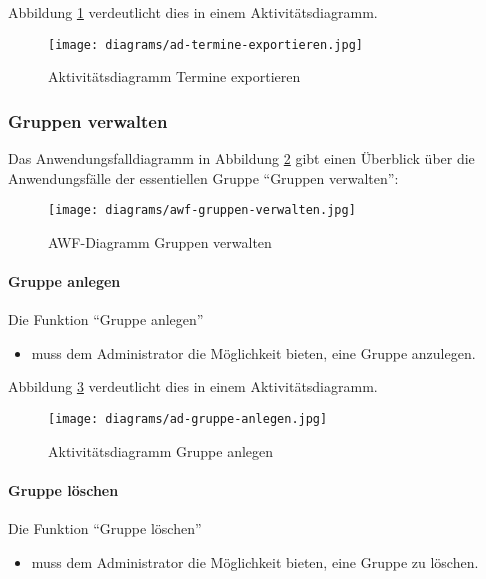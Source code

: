 Abbildung \ref{fig:ad-termine-exportieren} verdeutlicht dies in einem Aktivitätsdiagramm.

\begin{figure}
  \centering
  \texttt{[image: diagrams/ad-termine-exportieren.jpg]}
  \caption{Aktivitätsdiagramm Termine exportieren}
  \label{fig:ad-termine-exportieren}
\end{figure}

\subsubsection{Gruppen verwalten}

Das Anwendungsfalldiagramm in Abbildung \ref{fig:awf-gruppen-verwalten} gibt einen Überblick über die
Anwendungsfälle der essentiellen Gruppe ``Gruppen verwalten'':

\begin{figure}
  \centering
  \texttt{[image: diagrams/awf-gruppen-verwalten.jpg]}
  \caption{AWF-Diagramm Gruppen verwalten}
  \label{fig:awf-gruppen-verwalten}
\end{figure}

\paragraph{Gruppe anlegen}

Die Funktion ``Gruppe anlegen''
\begin{itemize}
  \item muss dem Administrator die Möglichkeit bieten, eine Gruppe anzulegen.
\end{itemize}

Abbildung \ref{fig:ad-gruppe-anlegen} verdeutlicht dies in einem Aktivitätsdiagramm.

\begin{figure}
  \centering
  \texttt{[image: diagrams/ad-gruppe-anlegen.jpg]}
  \caption{Aktivitätsdiagramm Gruppe anlegen}
  \label{fig:ad-gruppe-anlegen}
\end{figure}

\paragraph{Gruppe löschen}

Die Funktion ``Gruppe löschen''
\begin{itemize}
  \item muss dem Administrator die Möglichkeit bieten, eine Gruppe zu löschen.
\end{itemize}

